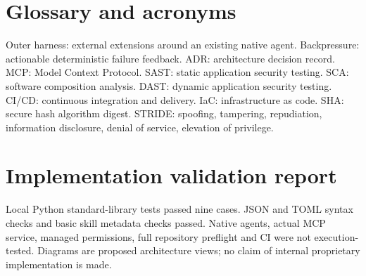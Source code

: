 \documentclass[11pt,letterpaper]{article}
\begin{document}
\clearpage\section{Glossary and acronyms}
Outer harness: external extensions around an existing native agent. Backpressure: actionable deterministic failure feedback. ADR: architecture decision record. MCP: Model Context Protocol. SAST: static application security testing. SCA: software composition analysis. DAST: dynamic application security testing. CI/CD: continuous integration and delivery. IaC: infrastructure as code. SHA: secure hash algorithm digest. STRIDE: spoofing, tampering, repudiation, information disclosure, denial of service, elevation of privilege.

\clearpage\section{Implementation validation report}
Local Python standard-library tests passed nine cases. JSON and TOML syntax checks and basic skill metadata checks passed. Native agents, actual MCP service, managed permissions, full repository preflight and CI were not execution-tested. Diagrams are proposed architecture views; no claim of internal proprietary implementation is made.
\end{document}
